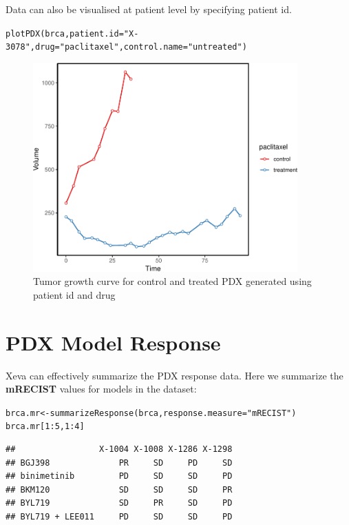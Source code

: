 \documentclass{article}\usepackage[]{graphicx}\usepackage[usenames,dvipsnames]{color}
\newcommand{\hlnum}[1]{\textcolor[rgb]{0.816,0.125,0.439}{#1}}%
\newcommand{\hlstr}[1]{\textcolor[rgb]{0.251,0.627,0.251}{#1}}%
\newcommand{\hlopt}[1]{\textcolor[rgb]{0,0,0}{#1}}%
\newcommand{\hlstd}[1]{\textcolor[rgb]{0.251,0.251,0.251}{#1}}%
\newcommand{\hlkwb}[1]{\textcolor[rgb]{0,0,0}{#1}}%
\newcommand{\hlkwc}[1]{\textcolor[rgb]{0.251,0.251,0.251}{#1}}%
\newcommand{\hlkwd}[1]{\textcolor[rgb]{0.878,0.439,0.125}{#1}}%
\newenvironment{knitrout}{}{} %
\begin{document}
Data can also be visualised at patient level by specifying patient id.
\begin{knitrout}
\color{fgcolor}\begin{kframe}
\begin{alltt}
\hlkwd{plotPDX}\hlstd{(brca,} \hlkwc{patient.id}\hlstd{=}\hlstr{"X-3078"}\hlstd{,} \hlkwc{drug}\hlstd{=}\hlstr{"paclitaxel"}\hlstd{,}\hlkwc{control.name} \hlstd{=} \hlstr{"untreated"}\hlstd{)}
\end{alltt}
\end{kframe}\begin{figure}
\includegraphics[width=4in]{figure/pdxplot3-1} \caption{Tumor growth curve for control and treated PDX generated using patient id and drug}\label{fig:pdxplot3}
\end{figure}

\end{knitrout}


\section{PDX Model Response}
Xeva can effectively summarize the PDX response data. Here we summarize the \textbf{mRECIST} values for models in the dataset:

\begin{knitrout}
\color{fgcolor}\begin{kframe}
\begin{alltt}
\hlstd{brca.mr} \hlkwb{<-} \hlkwd{summarizeResponse}\hlstd{(brca,} \hlkwc{response.measure} \hlstd{=} \hlstr{"mRECIST"}\hlstd{)}
\hlstd{brca.mr[}\hlnum{1}\hlopt{:}\hlnum{5}\hlstd{,} \hlnum{1}\hlopt{:}\hlnum{4}\hlstd{]}
\end{alltt}
\begin{verbatim}
##                 X-1004 X-1008 X-1286 X-1298
## BGJ398              PR     SD     PD     SD
## binimetinib         PD     SD     SD     PD
## BKM120              SD     SD     SD     PR
## BYL719              SD     PR     SD     PD
## BYL719 + LEE011     PD     SD     SD     PD
\end{verbatim}
\end{kframe}
\end{knitrout}
\end{document}
